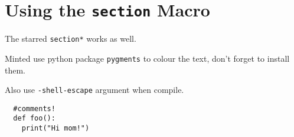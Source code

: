 \documentclass[11pt]{homework}
\begin{document}
\lipsum[10]

\section*{Using the \texttt{section} Macro}
The starred \texttt{section*} works as well.

\lipsum[11]

Minted use python package \texttt{pygments} to colour the text, don't forget to install them.

Also use \texttt{-shell-escape} argument when compile.

\begin{verbatim}
  #comments!
  def foo():
    print("Hi mom!")
\end{verbatim}
\end{document}
